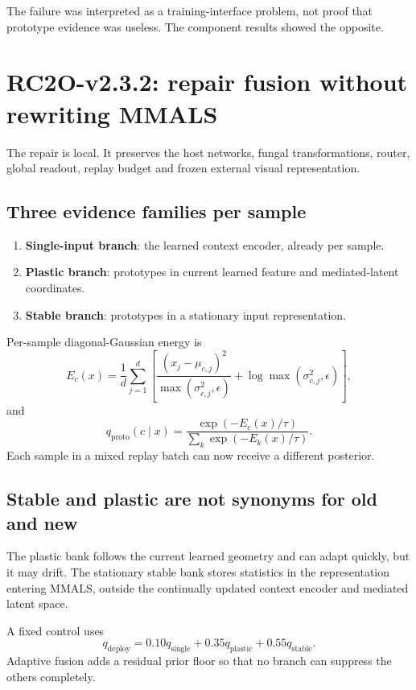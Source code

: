 \documentclass[11pt,a4paper]{article}
\begin{document}
\begin{researchbox}
The failure was interpreted as a training-interface problem, not proof that prototype evidence was useless. The component results showed the opposite.
\end{researchbox}

\section{RC2O-v2.3.2: repair fusion without rewriting MMALS}

The repair is local. It preserves the host networks, fungal transformations, router, global readout, replay budget and frozen external visual representation.

\subsection{Three evidence families per sample}

\begin{enumerate}[leftmargin=1.6em]
\item \textbf{Single-input branch}: the learned context encoder, already per sample.
\item \textbf{Plastic branch}: prototypes in current learned feature and mediated-latent coordinates.
\item \textbf{Stable branch}: prototypes in a stationary input representation.
\end{enumerate}

Per-sample diagonal-Gaussian energy is
\[
E_c(x)=\frac1d\sum_{j=1}^{d}
\left[
\frac{(x_j-\mu_{c,j})^2}{\max(\sigma_{c,j}^2,\epsilon)}
+\log\max(\sigma_{c,j}^2,\epsilon)
\right],
\]
and
\[
q_{\mathrm{proto}}(c\mid x)=
\frac{\exp(-E_c(x)/\tau)}{\sum_k\exp(-E_k(x)/\tau)}.
\]
Each sample in a mixed replay batch can now receive a different posterior.

\subsection{Stable and plastic are not synonyms for old and new}

The plastic bank follows the current learned geometry and can adapt quickly, but it may drift. The stationary stable bank stores statistics in the representation entering MMALS, outside the continually updated context encoder and mediated latent space.

A fixed control uses
\[
q_{\mathrm{deploy}}=0.10q_{\mathrm{single}}+0.35q_{\mathrm{plastic}}+0.55q_{\mathrm{stable}}.
\]
Adaptive fusion adds a residual prior floor so that no branch can suppress the others completely.
\end{document}
